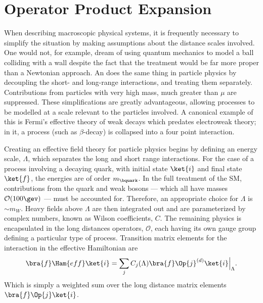\section{Operator Product Expansion}



When describing macroscopic physical systems, it is frequently necessary to simplify the situation by making
assumptions about the distance scales involved.
One would not, for example, dream of using quantum mechanics to model a ball colliding with a wall
despite the fact that the treatment would be far more proper than a Newtonian approach.
An \EFT does the same thing in particle physics
by decoupling the short- and long-range interactions, and treating them separately.
Contributions from particles with very high mass, much greater than $\mu$ are suppressed.
These simplifications are greatly advantageous, allowing processes to be modelled at a scale
relevant to the particles involved.
A canonical example of this is Fermi's effective theory of weak decays which predates electroweak
theory; in it, a process (such as $\beta$-decay) is collapsed into a four point interaction.

Creating an effective field theory for particle physics begins by defining an energy scale,
$\Lambda$, which separates the long and short range interactions.
For the case of a process involving a decaying \bquark quark, with initial state $\ket{i}$ and
final state $\ket{f}$,
the energies are of order $m_\bquark$.
In the full treatment of the SM, contributions from the \tquark quark and weak bosons --- which all
have masses $\mathcal{O}(100\gev)$ --- must be accounted for.
Therefore, an appropriate choice for $\Lambda$ is $\sim m_W$.
Heavy fields above $\Lambda$ are then integrated out and are parameterized by complex numbers,
known as Wilson coefficients, $C$.
The remaining physics is encapsulated in the long distances operators, $\mathcal{O}$, each having
its own gauge group defining a particular type of process.
Transition matrix elements for the interaction in the effective Hamiltonian are
\begin{equation}
  \bra{f}\Ham{eff}\ket{i} =
  \sum_j C_j(\Lambda)\bra{f}\Op{j}^{(d)}\ket{i}\Big|_{\Lambda}.
  \label{eq:th:opeham}
\end{equation}
Which is simply a weighted sum over the long distance matrix elements $\bra{f}\Op{j}\ket{i}$.


